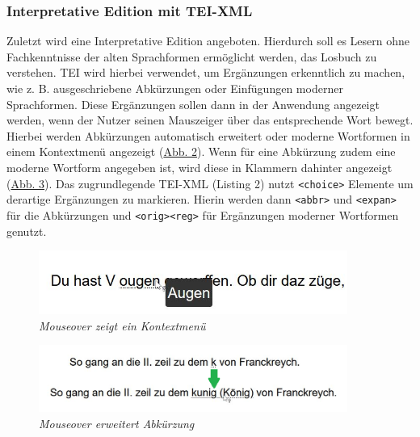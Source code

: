 \documentclass[12pt,a4paper]{article}
\begin{document}
	\subsubsection{Interpretative Edition mit TEI-XML}
		Zuletzt wird eine Interpretative Edition angeboten. Hierdurch soll es Lesern ohne Fachkenntnisse der alten Sprachformen 
		ermöglicht werden, das Losbuch zu verstehen. TEI wird hierbei verwendet, um Ergänzungen erkenntlich zu machen, wie z. B. 
		ausgeschriebene Abkürzungen oder Einfügungen moderner Sprachformen. Diese Ergänzungen sollen dann in der Anwendung angezeigt 
		werden, wenn der Nutzer seinen Mauszeiger über das entsprechende Wort bewegt. Hierbei werden Abkürzungen automatisch erweitert oder 
		moderne Wortformen in einem Kontextmenü angezeigt (\hyperref[Abbildung2]{Abb. 2}). 
		Wenn für eine Abkürzung zudem eine moderne Wortform angegeben ist, wird diese in Klammern dahinter angezeigt (\hyperref[Abbildung3]{Abb. 3}).
		Das zugrundlegende TEI-XML (Listing 2) nutzt \lstinline{<choice>} Elemente um derartige Ergänzungen zu markieren. Hierin werden dann
		\lstinline{<abbr>} und \lstinline{<expan>} für die Abkürzungen und \lstinline{<orig>}\lstinline{<reg>} für Ergänzungen moderner
		Wortformen genutzt.
			\begin{figure}[htbp]
				\label{Abbildung2}
				\centering
				\includegraphics[width=0.9\textwidth]{abb-2-tei-parsed-hover-ougen.JPG}
				\caption{\textit{Mouseover zeigt ein Kontextmenü}}
				
			\end{figure}
			\begin{figure}[htbp]
				\label{Abbildung3}
				\centering
				\includegraphics[width=0.9\textwidth]{k-kunig-koenig-onhover.png}
				\caption{\textit{Mouseover erweitert Abkürzung}}
				
			\end{figure}
	\newpage
\end{document}
